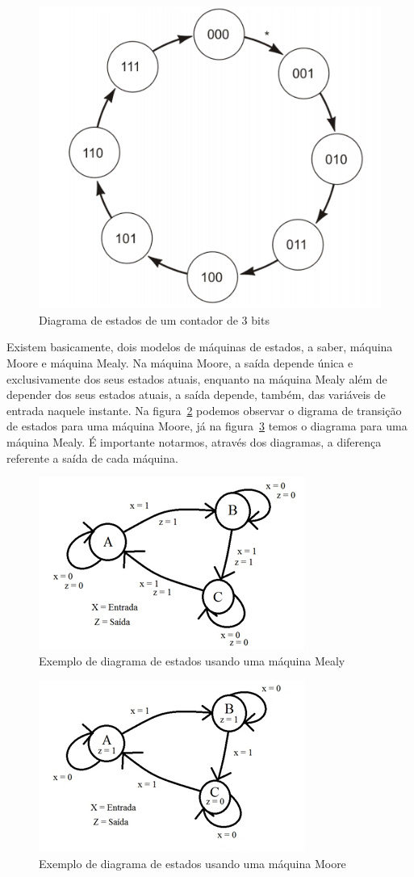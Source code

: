 \documentclass[12pt]{article}
\begin{document}
\begin{figure}[h]
\centering
\includegraphics[width=.4\textwidth]{img/diagrama-estados.png}
\caption{Diagrama de estados de um contador de 3 bits\cite{floyd2011digital}}
\label{fig:diagrama}
\end{figure}

Existem basicamente, dois modelos de máquinas de estados, a saber, máquina Moore e máquina Mealy\cite{singh2006digital}. Na máquina Moore, a saída depende única e exclusivamente dos seus estados atuais, enquanto na máquina Mealy além de depender dos seus estados atuais, a saída depende, também, das variáveis de entrada naquele instante. Na figura~\ref{fig:diagrama-mealy}  podemos observar  o digrama de transição de estados para uma máquina Moore, já na figura~\ref{fig:diagrama-moore} temos o diagrama para uma máquina Mealy. É importante notarmos, através dos diagramas, a diferença referente a saída de cada máquina.   

\begin{figure}[h]
\centering
\includegraphics[width=.5\textwidth]{img/fig2MaquinaMealy.png}
\caption{Exemplo de diagrama de estados usando uma máquina Mealy}
\label{fig:diagrama-mealy}
\end{figure}

\begin{figure}[h]
\centering
\includegraphics[width=.5\textwidth]{img/fig3MaquinaMoore.png}
\caption{Exemplo de diagrama de estados usando uma máquina Moore}
\label{fig:diagrama-moore}
\end{figure}
\end{document}
